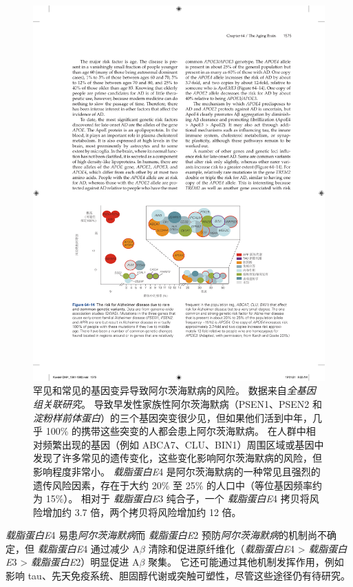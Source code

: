 \begin{figure}[htbp]
	\centering
	\includegraphics[width=1.0\linewidth]{chap64/fig_64_14}
	\caption{罕见和常见的基因变异导致阿尔茨海默病的风险。
		数据来自\textit{全基因组关联研究}。
		导致早发性家族性阿尔茨海默病（PSEN1、PSEN2 和 \textit{淀粉样前体蛋白}）的三个基因突变很少见，但如果他们活到中年，几乎 100\% 的携带这些突变的人都会患上阿尔茨海默病。
		在人群中相对频繁出现的基因（例如 ABCA7、CLU、BIN1）周围区域或基因中发现了许多常见的遗传变化，这些变化影响阿尔茨海默病的风险，但影响程度非常小。
		\textit{载脂蛋白E}4 是阿尔茨海默病的一种常见且强烈的遗传风险因素，存在于大约 20\% 至 25\% 的人口中（等位基因频率约为 15\%）。
		相对于 \textit{载脂蛋白E}3 纯合子，一个 \textit{载脂蛋白E}4 拷贝将风险增加约 3.7 倍，两个拷贝将风险增加约 12 倍\cite{karch2015alzheimer}。}
	\label{fig:64_14}
\end{figure}


\textit{载脂蛋白E}4 易患\textit{阿尔茨海默病}而 \textit{载脂蛋白E}2 预防\textit{阿尔茨海默病}的机制尚不确定，但 \textit{载脂蛋白E}4 通过减少 A$\beta$ 清除和促进原纤维化（\textit{载脂蛋白E}4 > \textit{载脂蛋白E}3 > \textit{载脂蛋白E}2）明显促进 A$\beta$ 聚集。
它还可能通过其他机制发挥作用，例如影响 tau、先天免疫系统、胆固醇代谢或突触可塑性，尽管这些途径仍有待研究。


